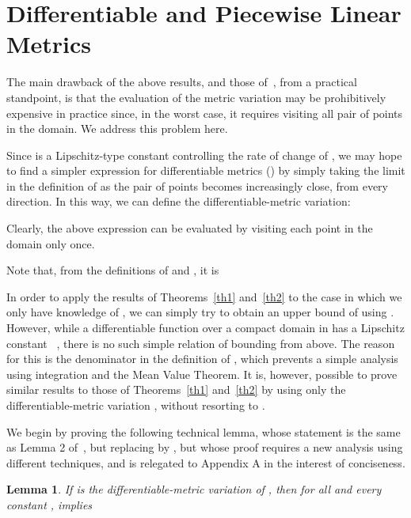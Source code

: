\documentclass[11pt]{article}
\newtheorem{lemma}[theorem]{Lemma}
\begin{document}
\section{Differentiable and Piecewise Linear Metrics}\label{C1}










The main drawback of  the above results, and those of~\cite{avd}, from a practical standpoint, is that the evaluation of the metric variation  may be prohibitively expensive in practice since, 
	in the worst case, it requires visiting all pair of points in the domain.  We address this problem here. 

Since  is a Lipschitz-type constant controlling the rate of change of , we may hope to find a simpler expression for differentiable metrics () by simply taking the limit 
	in the definition of  as the pair of points becomes increasingly close, from every direction. In this way, we can define the differentiable-metric variation:

Clearly, the above expression can be evaluated by visiting each point in the domain only once. 

Note that, from the definitions of  and , it is


In order to apply the results of Theorems~\ref{th1} and~\ref{th2} to the case in which we only have knowledge of , we can simply try to obtain an upper bound of  using . 
However, while a differentiable function  over a compact domain in  has a Lipschitz constant ~\cite{rudin-analysis}, 
	there is no such simple relation of   bounding   from above. 
The reason for this is the denominator  in the definition of , which prevents a simple analysis using integration and the Mean Value Theorem. 
It is, however, possible to prove similar results to those of Theorems~\ref{th1} and~\ref{th2} by using only the differentiable-metric variation , without resorting to . 




	


We begin by proving the following technical lemma, whose statement is the same as Lemma 2 of~\cite{avd}, but replacing  by , 
	but whose proof requires a new analysis using different techniques, and is relegated to Appendix A in the interest of conciseness. 


\begin{lemma}\label{lem2}
	If  is the differentiable-metric variation  of , then for all  and every constant ,  implies
		
\end{lemma}
\end{document}
